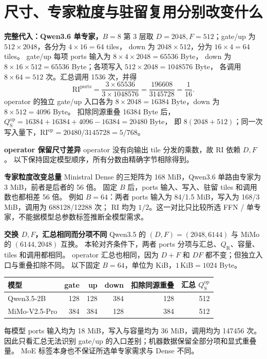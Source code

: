 \documentclass[11pt,a4paper,fontset=fandol]{ctexart}
\newcommand{\qs}{Q_{\mathrm S}}
\newcommand{\qr}{Q_{\mathrm R}}
\newcommand{\RI}{\mathrm{RI}}
\newcommand{\op}{\mathrm{op}}
\newcommand{\loc}{\mathrm{ports}}
\newcommand{\para}[1]{\par\smallskip\noindent\textbf{#1}\quad}
\begin{document}
\section{尺寸、专家粒度与驻留复用分别改变什么}
\para{完整代入：Qwen3.6 单专家，$B=8$}
第 3 层取 $D=2048,F=512$；gate/up 为 $512\times2048$，各分为 $4\times16=64$ tiles，
down 为 $2048\times512$，分为 $16\times4=64$ tiles。
gate/up 每项 ports 输入为 $8\times4\times2048=65536$ Byte，
down 为 $8\times16\times512=65536$ Byte；各项写入 $512\times2048=1048576$ Byte，
各调用 $8\times64=512$ 次。汇总调用 1536 次，并得
\begin{equation}
\RI^\loc=\frac{3\times65536}{3\times1048576}
=\frac{196608}{3145728}=\frac1{16}.
\end{equation}
operator 的独立 gate/up 入口各为 $8\times2048=16384$ Byte，down 为 $8\times512=4096$ Byte。
扣除同源重叠 16384 Byte 后，$\qs^\op=16384+16384+4096-16384=20480$ Byte，
即 $8(2048+512)$；同一次写入量下，$\RI^\op=20480/3145728=5/768$。

\para{operator 保留尺寸差异}
operator 没有向输出 tile 分发的乘数，故 RI 依赖 $D,F$。
以下保持固定模型顺序，所有分数由精确字节相除得到。
\begin{center}

\end{center}

\para{专家粒度改变总量}
Ministral Dense 的三矩阵为 168 MiB，Qwen3.6 单路由专家为 3 MiB，前者是后者的 56 倍。
固定 $B$ 后，ports 输入、写入、驻留 tiles 和调用数也都相差 56 倍。
例如 $B=64$：两者 ports 输入为 84/1.5 MiB，写入为 168/3 MiB，调用为 688128/12288 次；
RI 均为 $1/2$。这一对比只比较所选 FFN / 单专家，不能据模型总参数标签推断全模型需求。

\para{交换 $D,F$，汇总相同而分项不同}
Qwen3.5 的 $(D,F)=(2048,6144)$ 与 MiMo 的 $(6144,2048)$ 互换。
本轮对齐条件下，两者 ports 分项与汇总、$\qr$、容量、tiles 和调用都相同。
operator 汇总也相同，因为 $D+F$ 和 $DF$ 都不变；但独立入口与重叠扣除不同。
以下固定 $B=64$，单位为 KiB，$1\,\mathrm{KiB}=1024$ Byte。
\begin{center}\small
\begin{tabular}{@{}lrrrrr@{}}\toprule
模型 & gate & up & down & 扣除同源重叠 & 汇总 $\qs^\op$\\\midrule
Qwen3.5-2B & 128 & 128 & 384 & 128 & 512\\
MiMo-V2.5-Pro & 384 & 384 & 128 & 384 & 512\\\bottomrule
\end{tabular}
\end{center}
每模型 ports 输入均为 18 MiB，写入与容量均为 36 MiB，调用均为 147456 次。
因此只看汇总无法识别 gate/up 的入口差别；机器数据保留全部分项和显式重叠量。
MoE 标签本身也不保证所选单专家需求与 Dense 不同。
\end{document}
